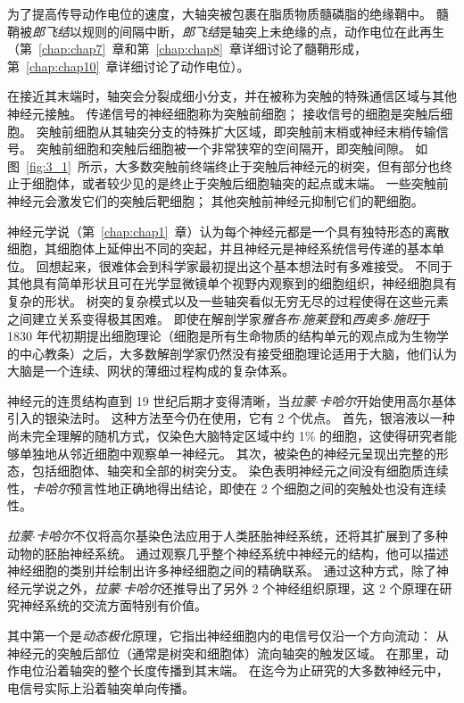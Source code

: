 为了提高传导动作电位的速度，大轴突被包裹在脂质物质髓磷脂的绝缘鞘中。
髓鞘被\textit{郎飞结}以规则的间隔中断，\textit{郎飞结}是轴突上未绝缘的点，动作电位在此再生（第~\ref{chap:chap7}~章和第~\ref{chap:chap8}~章详细讨论了髓鞘形成，第~\ref{chap:chap10}~章详细讨论了动作电位）。


在接近其末端时，轴突会分裂成细小分支，并在被称为突触的特殊通信区域与其他神经元接触。
传递信号的神经细胞称为突触前细胞；
接收信号的细胞是突触后细胞。
突触前细胞从其轴突分支的特殊扩大区域，即突触前末梢或神经末梢传输信号。
突触前细胞和突触后细胞被一个非常狭窄的空间隔开，即突触间隙。
如图~\ref{fig:3_1}~所示，大多数突触前终端终止于突触后神经元的树突，但有部分也终止于细胞体，或者较少见的是终止于突触后细胞轴突的起点或末端。 
一些突触前神经元会激发它们的突触后靶细胞；
其他突触前神经元抑制它们的靶细胞。


神经元学说（第~\ref{chap:chap1}~章）认为每个神经元都是一个具有独特形态的离散细胞，其细胞体上延伸出不同的突起，并且神经元是神经系统信号传递的基本单位。
回想起来，很难体会到科学家最初提出这个基本想法时有多难接受。
不同于其他具有简单形状且可在光学显微镜单个视野内观察到的细胞组织，神经细胞具有复杂的形状。
树突的复杂模式以及一些轴突看似无穷无尽的过程使得在这些元素之间建立关系变得极其困难。
即使在解剖学家\textit{雅各布$\cdot$施莱登}和\textit{西奥多$\cdot$施旺}于 1830 年代初期提出细胞理论（细胞是所有生命物质的结构单元的观点成为生物学的中心教条）之后，大多数解剖学家仍然没有接受细胞理论适用于大脑，他们认为大脑是一个连续、网状的薄细过程构成的复杂体系。


神经元的连贯结构直到 19 世纪后期才变得清晰，当\textit{拉蒙$\cdot$卡哈尔}开始使用高尔基体引入的银染法时。
这种方法至今仍在使用，它有 2 个优点。
首先，银溶液以一种尚未完全理解的随机方式，仅染色大脑特定区域中约 1\% 的细胞，这使得研究者能够单独地从邻近细胞中观察单一神经元。
其次，被染色的神经元呈现出完整的形态，包括细胞体、轴突和全部的树突分支。
染色表明神经元之间没有细胞质连续性，\textit{卡哈尔}预言性地正确地得出结论，即使在 2 个细胞之间的突触处也没有连续性。


\textit{拉蒙$\cdot$卡哈尔}不仅将高尔基染色法应用于人类胚胎神经系统，还将其扩展到了多种动物的胚胎神经系统。 
通过观察几乎整个神经系统中神经元的结构，他可以描述神经细胞的类别并绘制出许多神经细胞之间的精确联系。
通过这种方式，除了神经元学说之外，\textit{拉蒙$\cdot$卡哈尔}还推导出了另外 2 个神经组织原理，这 2 个原理在研究神经系统的交流方面特别有价值。


其中第一个是\textit{动态极化}原理，它指出神经细胞内的电信号仅沿一个方向流动：
从神经元的突触后部位（通常是树突和细胞体）流向轴突的触发区域。
在那里，动作电位沿着轴突的整个长度传播到其末端。
在迄今为止研究的大多数神经元中，电信号实际上沿着轴突单向传播。


